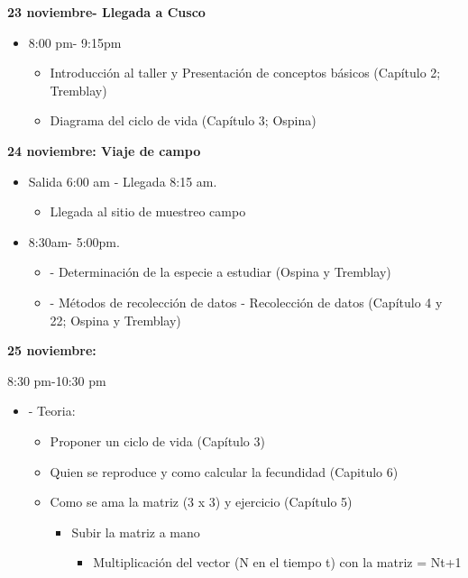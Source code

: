 \documentclass[
]{book}
\providecommand{\tightlist}{%
  \setlength{\itemsep}{0pt}\setlength{\parskip}{0pt}}
\theoremstyle{definition}
\theoremstyle{definition}
\theoremstyle{definition}
\theoremstyle{definition}
\theoremstyle{remark}
\begin{document}
\textbf{23 noviembre- Llegada a Cusco}

\begin{itemize}
\item
  8:00 pm- 9:15pm

  \begin{itemize}
  \tightlist
  \item
    Introducción al taller y Presentación de conceptos básicos
    (Capítulo 2; Tremblay)
  \item
    Diagrama del ciclo de vida (Capítulo 3; Ospina)
  \end{itemize}
\end{itemize}

\textbf{24 noviembre: Viaje de campo}

\begin{itemize}
\item
  Salida 6:00 am - Llegada 8:15 am.

  \begin{itemize}
  \tightlist
  \item
    Llegada al sitio de muestreo campo
  \end{itemize}
\item
  8:30am- 5:00pm.

  \begin{itemize}
  \item
    - Determinación de la especie a estudiar (Ospina y Tremblay)
  \item
    - Métodos de recolección de datos - Recolección de datos
    (Capítulo 4 y 22; Ospina y Tremblay)
  \end{itemize}
\end{itemize}

\textbf{25 noviembre:}

8:30 pm-10:30 pm

\begin{itemize}
\tightlist
\item
  - Teoria:

  \begin{itemize}
  \tightlist
  \item
    Proponer un ciclo de vida (Capítulo 3)
  \item
    Quien se reproduce y como calcular la fecundidad (Capitulo 6)
  \item
    Como se ama la matriz (3 x 3) y ejercicio (Capítulo 5)

    \begin{itemize}
    \tightlist
    \item
      Subir la matriz a mano

      \begin{itemize}
      \tightlist
      \item
        Multiplicación del vector (N en el tiempo t) con la
        matriz = Nt+1
      \end{itemize}
    \end{itemize}
  \end{itemize}
\end{itemize}
\end{document}
